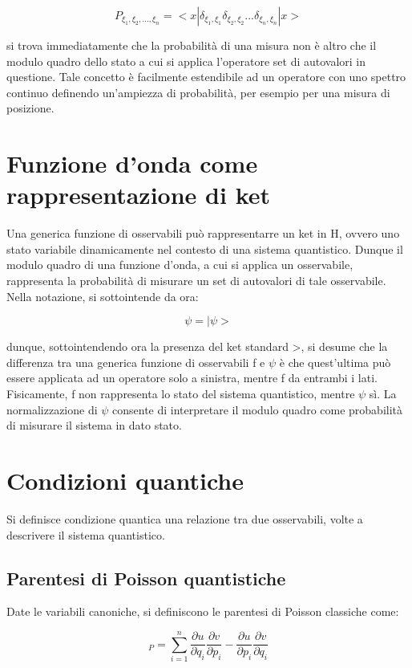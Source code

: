 \documentclass{article}
\begin{document}
\begin{equation}
    P_{\xi_1,\xi_2,...,\xi_n} = <x|\delta_{\xi_1,\xi_1}\delta_{\xi_2,\xi_2}...\delta_{\xi_n,\xi_n}|x>
\end{equation}

si trova immediatamente che la probabilità di una misura non è altro che il modulo quadro dello stato a cui si applica l'operatore set di autovalori in questione.
Tale concetto è facilmente estendibile ad un operatore con uno spettro continuo definendo un'ampiezza di probabilità, per esempio per una misura di posizione.

\section{Funzione d'onda come rappresentazione di ket}
Una generica funzione di osservabili può rappresentarre un ket in H, ovvero uno stato variabile dinamicamente nel contesto di una sistema quantistico.
Dunque il modulo quadro di una funzione d'onda, a cui si applica un osservabile, rappresenta la probabilità di misurare un set di autovalori di tale osservabile.
Nella notazione, si sottointende da ora:

\begin{equation}
    \psi = |\psi>
\end{equation}

dunque, sottointendendo ora la presenza del ket standard >, si desume che la differenza tra una generica funzione di osservabili f e $\psi$ è che
quest'ultima può essere applicata ad un operatore solo a sinistra, mentre f da entrambi i lati.
Fisicamente, f non rappresenta lo stato del sistema quantistico, mentre $\psi$ sì.
La normalizzazione di $\psi$ consente di interpretare il modulo quadro come probabilità di misurare il sistema in dato stato.


\section{Condizioni quantiche}
Si definisce condizione quantica una relazione tra due osservabili, volte a descrivere il sistema quantistico.

\subsection{Parentesi di Poisson quantistiche}
Date le variabili canoniche, si definiscono le parentesi di Poisson classiche come:

\begin{equation}
    [u,v]_P = \sum_{i=1}^{n} \frac{\partial u}{\partial q_i}\frac{\partial v}{\partial p_i} - \frac{\partial u}{\partial p_i}\frac{\partial v}{\partial q_i}
\end{equation}
\end{document}
